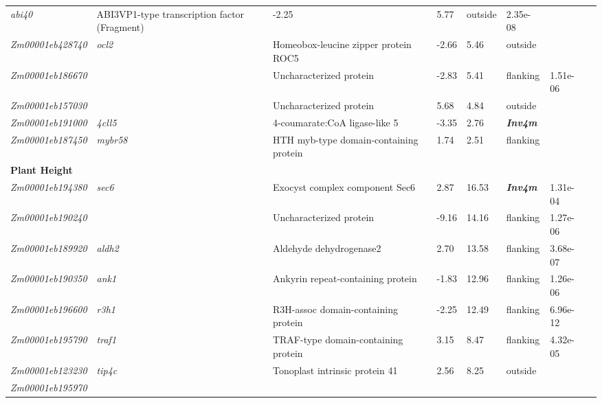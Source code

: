 \documentclass[9pt,twocolumn,twoside]{rilabRxiv}
\newcommand{\invfour}{\textit{Inv4m}\xspace}
\begin{document}
\begin{table}[!ht]
{\begin{tabular}{llllllll}
  \textit{abi40} &
  ABI3VP1-type transcription factor (Fragment) &
  -2.25 &
  5.77 &
  outside &
  2.35e-08 &
  \cite{liu2023, peiffer2013, peiffer2014, wang2021} \\
  \textit{Zm00001eb428740} &
  \textit{ocl2} &
  Homeobox-leucine zipper protein ROC5 &
  -2.66 &
  5.46 &
  outside &
   &
  \cite{wang2021} \\
  \textit{Zm00001eb186670} &
   &
  Uncharacterized protein &
  -2.83 &
  5.41 &
  flanking &
  1.51e-06 &
  \cite{jiao2012, li2016, liu2023} \\
  \textit{Zm00001eb157030} &
   &
  Uncharacterized protein &
  5.68 &
  4.84 &
  outside &
   &
  \cite{li2016, liu2023} \\
  \textit{Zm00001eb191000} &
  \textit{4cll5} &
  4-coumarate:CoA ligase-like 5 &
  -3.35 &
  2.76 &
  \textbf{\invfour} &
   &
  \cite{wang2021} \\
  \textit{Zm00001eb187450} &
  \textit{mybr58} &
  HTH myb-type domain-containing protein &
  1.74 &
  2.51 &
  flanking &
   &
  \cite{wang2021} \\
 \midrule
\multicolumn{8}{l}{\textbf{Plant Height}} \\ \midrule
  \textit{Zm00001eb194380} &
  \textit{sec6} &
  Exocyst complex component Sec6 &
  2.87 &
  16.53 &
  \textbf{\invfour} &
  1.31e-04 &
  \cite{liu2023, peiffer2014} \\
  \textit{Zm00001eb190240} &
   &
  Uncharacterized protein &
  -9.16 &
  14.16 &
  flanking &
  1.27e-06 &
  \cite{liu2023} \\
  \textit{Zm00001eb189920} &
  \textit{aldh2} &
  Aldehyde dehydrogenase2 &
  2.70 &
  13.58 &
  flanking &
  3.68e-07 &
  \cite{liu2023, peiffer2014} \\
  \textit{Zm00001eb190350} &
  \textit{ank1} &
  Ankyrin repeat-containing protein &
  -1.83 &
  12.96 &
  flanking &
  1.26e-06 &
  \cite{liu2023} \\
  \textit{Zm00001eb196600} &
  \textit{r3h1} &
  R3H-assoc domain-containing protein &
  -2.25 &
  12.49 &
  flanking &
  6.96e-12 &
  \cite{liu2023, peiffer2014} \\
  \textit{Zm00001eb195790} &
  \textit{traf1} &
  TRAF-type domain-containing protein &
  3.15 &
  8.47 &
  flanking &
  4.32e-05 &
  \cite{liu2023, peiffer2014} \\
  \textit{Zm00001eb123230} &
  \textit{tip4c} &
  Tonoplast intrinsic protein 41 &
  2.56 &
  8.25 &
  outside &
   &
  \cite{liu2023} \\
  \textit{Zm00001eb195970} &

\end{tabular}}
\end{table}
\end{document}
